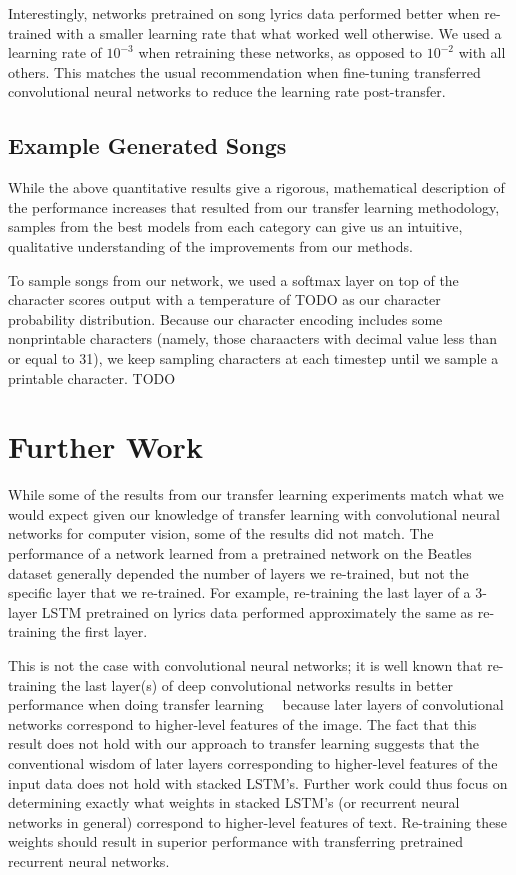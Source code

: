 \documentclass[10pt,twocolumn,letterpaper]{article}
\begin{document}
	Interestingly, networks pretrained on song lyrics data performed better when re-trained with a smaller learning rate that what worked well otherwise. We used a learning rate of $10^{-3}$ when retraining these networks, as opposed to $10^{-2}$ with all others. This matches the usual recommendation when fine-tuning transferred convolutional neural networks to reduce the learning rate post-transfer.
	
	\subsection{Example Generated Songs}
		While the above quantitative results give a rigorous, mathematical description of the performance increases that resulted from our transfer learning methodology, samples from the best models from each category can give us an intuitive, qualitative understanding of the improvements from our methods.
		
		To sample songs from our network, we used a softmax layer on top of the character scores output with a temperature of TODO as our character probability distribution. Because our character encoding includes some nonprintable characters (namely, those charaacters with decimal value less than or equal to 31), we keep sampling characters at each timestep until we sample a printable character. TODO

\section{Further Work}
	While some of the results from our transfer learning experiments match what we would expect given our knowledge of transfer learning with convolutional neural networks for computer vision, some of the results did not match. The performance of a network learned from a pretrained network on the Beatles dataset generally depended the number of layers we re-trained, but not the specific layer that we re-trained. For example, re-training the last layer of a 3-layer LSTM pretrained on lyrics data performed approximately the same as re-training the first layer.
	
	This is not the case with convolutional neural networks; it is well known that re-training the last layer(s) of deep convolutional networks results in better performance when doing transfer learning~\cite{CNNOffTheShelf}~\cite{TransferableFeaturesNN} because later layers of convolutional networks correspond to higher-level features of the image. The fact that this result does not hold with our approach to transfer learning suggests that the conventional wisdom of later layers corresponding to higher-level features of the input data does not hold with stacked LSTM's. Further work could thus focus on determining exactly what weights in stacked LSTM's (or recurrent neural networks in general) correspond to higher-level features of text. Re-training these weights should result in superior performance with transferring pretrained recurrent neural networks.
	
\end{document}
